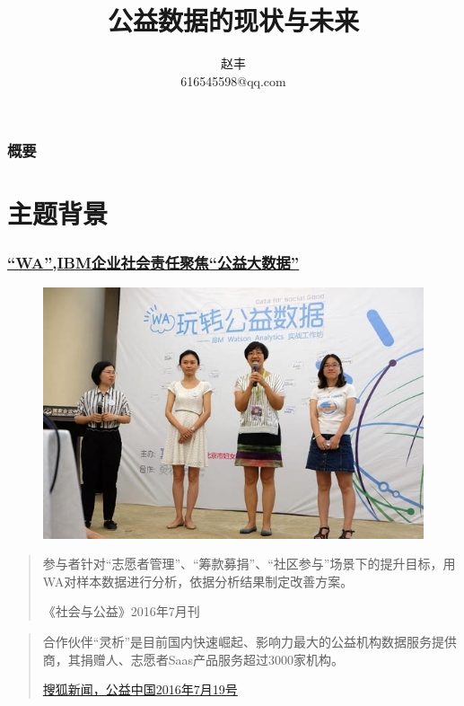 \documentclass{ctexbeamer}
\title{公益数据的现状与未来}
\author{赵丰\\ 616545598@qq.com}
\begin{document}
\begin{frame}
\titlepage
\end{frame}
\begin{frame}
\frametitle{概要}
\tableofcontents
\end{frame}
\section{主题背景}
\begin{frame}%
\frametitle{\href{http://www.ixueshu.com/document/332c6697f89ecc79318947a18e7f9386.html}{“WA”,IBM企业社会责任聚焦“公益大数据”}}
\begin{figure}
\includegraphics[width=\textwidth]{background1.jpeg}
\end{figure}
\end{frame}
\begin{frame}
\begin{quote}
参与者针对“志愿者管理”、“筹款募捐”、“社区参与”场景下的提升目标，用WA对样本数据进行分析，依据分析结果制定改善方案。
\begin{flushright}
《社会与公益》2016年7月刊
\end{flushright}
\end{quote}
\begin{quote}
合作伙伴“灵析”是目前国内快速崛起、影响力最大的公益机构数据服务提供商，其捐赠人、志愿者Saas产品服务超过3000家机构。
\begin{flushright}
\href{http://www.sohu.com/a/106631644_350071}{搜狐新闻，公益中国2016年7月19号}
\end{flushright}
\end{quote}
\end{frame}
\end{document}
